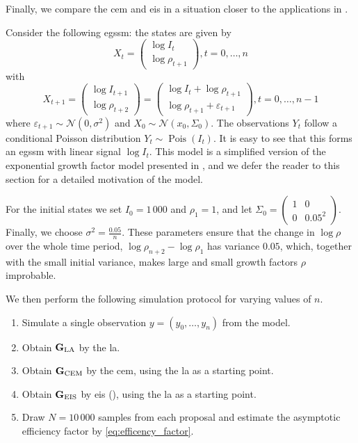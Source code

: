 Finally, we compare the \gls{cem} and \gls{eis} in a situation closer to the applications in . 
\begin{example}
    \label{ex:growth-factor-ssm-aef}
    Consider the following \gls{egssm}: the states are given by 
    $$
        X_{t} = \begin{pmatrix}
            \log I_{t}\\
            \log \rho_{t + 1}
        \end{pmatrix}, t = 0, \dots, n
    $$
    with 
    $$
        X_{t + 1} = \begin{pmatrix}
            \log I_{t+1} \\
            \log \rho_{t + 2}
        \end{pmatrix} = \begin{pmatrix}
            \log I_{t} + \log \rho_{t+1} \\
            \log \rho_{t + 1} + \varepsilon_{t + 1}
        \end{pmatrix}, t = 0, \dots, n - 1
    $$
    where $\varepsilon_{t + 1} \sim \mathcal N (0, \sigma^{2})$ and $X_{0} \sim \mathcal N( x_{0}, \Sigma_{0})$. 
    The observations $Y_{t}$ follow a conditional Poisson distribution $Y_{t} \sim \operatorname{Pois} \left( I_{t} \right)$. It is easy to see that this forms  an \gls{egssm} with linear signal $\log I_{t}$.
    This model is a simplified version of the exponential growth factor model presented in , and we defer the reader to this section for a detailed motivation of the model.

    For the initial states we set $I_{0} = 1\,000$ and $\rho_{1} = 1$, and let $\Sigma_{0} = \begin{pmatrix}
        1 & 0 \\
        0 & 0.05^{2}
    \end{pmatrix}$. Finally, we choose $\sigma^{2} = \frac{0.05}{n}$. These parameters ensure that the change in  $\log \rho$ over the whole time period, $\log \rho_{n + 2} - \log \rho_{1}$ has variance $0.05$, which, together with the small initial variance, makes large and small growth factors $\rho$ improbable.

    We then perform the following simulation protocol for varying values of $n$. 
    \begin{enumerate}
        \item Simulate a single observation $y=(y_{0}, \dots, y_{n})$ from the model.
        \item Obtain $\mathbf G_{\text{LA}}$ by the \gls{la}.
        \item Obtain $\mathbf G_{\text{CEM}}$ by the \gls{cem}, using the \gls{la} as a starting point.
        \item Obtain $\mathbf G_{\text{EIS}}$ by \gls{eis} (), using the \gls{la} as a starting point. 
        \item Draw $N = 10\,000$ samples from each proposal and estimate the asymptotic efficiency factor by  \eqref{eq:efficency_factor}.
    \end{enumerate}

\end{example}

